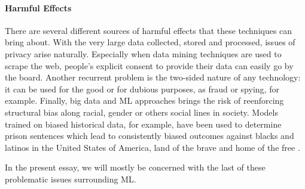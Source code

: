 \documentclass{article}
\begin{document}
\paragraph{Harmful Effects}
There are several different sources of harmful effects that these techniques can bring about. With the very large data collected, stored and processed, issues of privacy arise naturally. Especially when data mining techniques are used to scrape the web, people's explicit consent to provide their data can easily go by the board. Another recurrent problem is the two-sided nature of any technology: it can be used for the good or for dubious purposes, as fraud or spying, for example. Finally, big data and ML approaches brings the risk of reenforcing structural bias along racial, gender or others social lines in society. Models trained on biased historical data, for example, have been used to determine prison sentences which lead to consistently biased outcomes against blacks and latinos in the United States of America, land of the brave and home of the free \cite{angwin2016machine}.

In the present essay, we will mostly be concerned with the last of these problematic issues surrounding ML.


\end{document}
